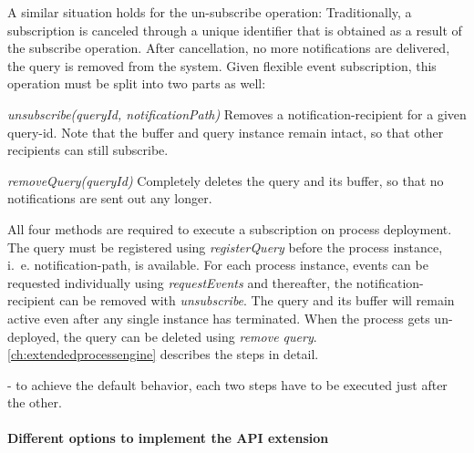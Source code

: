 
A similar situation holds for the un-subscribe operation: Traditionally, a subscription is canceled through a unique identifier that is obtained as a result of the subscribe operation. After cancellation, no more notifications are delivered, the query is removed from the system.
Given flexible event subscription, this operation must be split into two parts as well:

\begin{aenumerate}
	\setcounter{enumi}{2}
	\item \textit{unsubscribe(queryId, notificationPath)}\newline
	Removes a notification-recipient for a given query-id. Note that the buffer and query instance remain intact, so that other recipients can still subscribe.
	\item \textit{removeQuery(queryId)}\newline
	Completely deletes the query and its buffer, so that no notifications are sent out any longer. 
\end{aenumerate}\label{def:apiextension-unsubscribe}

\noindent
All four methods are required to execute a subscription on process deployment.
The query must be registered using \textit{registerQuery} before the process instance, i.~e. notification-path, is available. For each process instance, events can be requested individually using \textit{requestEvents} and thereafter, the notification-recipient can be removed with \textit{unsubscribe}.
The query and its buffer will remain active even after any single instance has terminated. When the process gets un-deployed, the query can be deleted using \textit{remove query}.
\autoref{ch:extendedprocessengine} describes the steps in detail.

- to achieve the default behavior, each two steps have to be executed just after the other.



\paragraph{Different options to implement the API extension}

